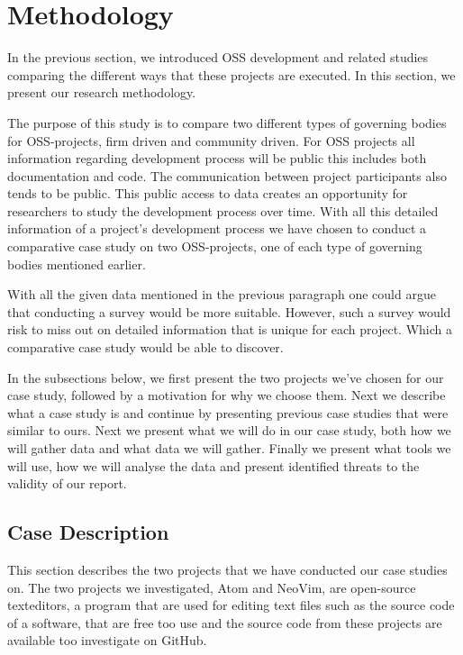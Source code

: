 \documentclass[a4paper,11pt]{article}
\begin{document}
{\section{Methodology}
\label{sec:method}
In the previous section, we introduced OSS development and related studies comparing the different ways that these projects are executed. In this section, we present our research methodology.

The purpose of this study is to compare two different types of governing bodies for OSS-projects, firm driven and community driven. For OSS projects all information regarding development process will be public this includes both documentation and code. The communication between project participants also tends to be public. This public access to data creates an opportunity for researchers to study the development process over time. With all this detailed information of a project's development process we have chosen to conduct a comparative case study on two OSS-projects, one of each type of governing bodies mentioned earlier.

With all the given data mentioned in the previous paragraph one could argue that conducting a survey would be more suitable. However, such a survey would risk to miss out on detailed information that is unique for each project. Which a comparative case study would be able to discover.

In the subsections below, we first present the two projects we've chosen for our case study, followed by a motivation for why we choose them. Next we describe what a case study is and continue by presenting previous case studies that were similar to ours. Next we present what we will do in our case study, both how we will gather data and what data we will gather. Finally we present what tools we will use, how we will analyse the data and present identified threats to the validity of our report.

\subsection{Case Description}
This section describes the two projects that we have conducted our case studies on. The two projects we investigated, Atom and NeoVim, are open-source texteditors, a program that are used for editing text files such as the source code of a software, that are free too use and the source code from these projects are available too investigate on GitHub.

}
\end{document}
